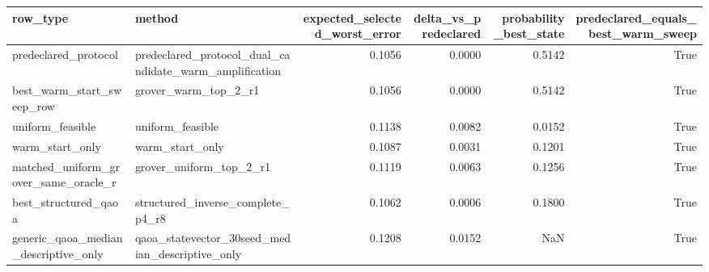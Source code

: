 \begin{tabular}{llrrrr}
\toprule
row\_type & method & expected\_selected\_worst\_error & delta\_vs\_predeclared & probability\_best\_state & predeclared\_equals\_best\_warm\_sweep \\
\midrule
predeclared\_protocol & predeclared\_protocol\_dual\_candidate\_warm\_amplification & 0.1056 & 0.0000 & 0.5142 & True \\
best\_warm\_start\_sweep\_row & grover\_warm\_top\_2\_r1 & 0.1056 & 0.0000 & 0.5142 & True \\
uniform\_feasible & uniform\_feasible & 0.1138 & 0.0082 & 0.0152 & True \\
warm\_start\_only & warm\_start\_only & 0.1087 & 0.0031 & 0.1201 & True \\
matched\_uniform\_grover\_same\_oracle\_r & grover\_uniform\_top\_2\_r1 & 0.1119 & 0.0063 & 0.1256 & True \\
best\_structured\_qaoa & structured\_inverse\_complete\_p4\_r8 & 0.1062 & 0.0006 & 0.1800 & True \\
generic\_qaoa\_median\_descriptive\_only & qaoa\_statevector\_30seed\_median\_descriptive\_only & 0.1208 & 0.0152 & NaN & True \\
\bottomrule
\end{tabular}
